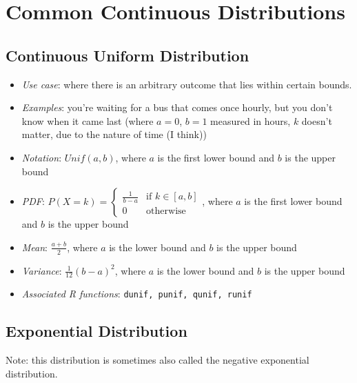 \documentclass[12pt]{article}
\begin{document}
\section*{Common Continuous Distributions}

\subsection*{Continuous Uniform Distribution}

\begin{itemize}
	\item \textit{Use case}: where there is an arbitrary outcome that lies within certain bounds.
	\item \textit{Examples}: you're waiting for a bus that comes once hourly,
	      but you don't know when it came last (where $a = 0$, $b = 1$ measured
	      in hours, $k$ doesn't matter, due to the nature of time (I think))
	\item \textit{Notation}: $Unif(a, b)$, where $a$ is the first lower bound and $b$ is the upper bound
	\item \textit{PDF}: $P(X = k) = \begin{cases}
			      \frac{1}{b-a} & \text{if } k \in [a, b] \\
			      0             & \text{otherwise}
		      \end{cases}$, where $a$ is the first lower bound and $b$ is the upper bound
	\item \textit{Mean}: $\frac{a + b}{2}$, where $a$ is the lower bound and $b$ is the upper bound
	\item \textit{Variance}: $\frac{1}{12}(b-a)^2$, where $a$ is the lower bound and $b$ is the upper bound
	\item \textit{Associated R functions}: \verb|dunif, punif, qunif, runif|
\end{itemize}

\subsection*{Exponential Distribution}
Note: this distribution is sometimes also called the negative exponential
distribution.
\end{document}
